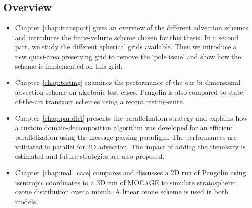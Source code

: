 \subsection*{Overview}
\begin{itemize}
  \item Chapter~\ref{chap:transport} gives an overview of the different
    advection schemes and introduces the finite-volume scheme chosen for this
    thesis. In a second part, we study the different spherical grids available.
    Then we introduce a new quasi-area preserving grid to remove the `pole
    issue' and show how the scheme is implemented on this grid.
  \item Chapter~\ref{chap:testing} examines the performance of the
    our bi-dimensional advection scheme on algebraic test cases. Pangolin is also
    compared to state-of-the-art transport schemes using a recent
    testing-suite.
  \item Chapter~\ref{chap:parallel} presents the parallelization strategy and
    explains how a custom domain-decom\-position algorithm was developed 
    for an efficient parallelization using the message-passing paradigm. The
    performances are validated in parallel for 2D advection. The impact of
    adding the chemistry is estimated and future strategies are also proposed.
  \item Chapter~\ref{chap:real_case} compares and discusses a 2D run of Pangolin
    using isentropic coordinates to a 3D run of MOCAGE to simulate stratospheric
    ozone distribution over a month. A linear ozone scheme is used in both
    models.
\end{itemize}

